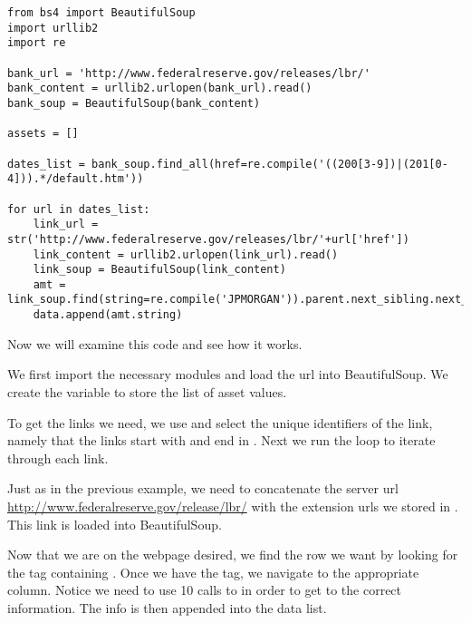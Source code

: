\begin{lstlisting}
from bs4 import BeautifulSoup
import urllib2
import re

bank_url = 'http://www.federalreserve.gov/releases/lbr/'
bank_content = urllib2.urlopen(bank_url).read()
bank_soup = BeautifulSoup(bank_content)

assets = []

dates_list = bank_soup.find_all(href=re.compile('((200[3-9])|(201[0-4])).*/default.htm'))

for url in dates_list:
    link_url = str('http://www.federalreserve.gov/releases/lbr/'+url['href'])
    link_content = urllib2.urlopen(link_url).read()
    link_soup = BeautifulSoup(link_content)
    amt = link_soup.find(string=re.compile('JPMORGAN')).parent.next_sibling.next_sibling.next_sibling.next_sibling.next_sibling.next_sibling.next_sibling.next_sibling.next_sibling.next_sibling
    data.append(amt.string)
\end{lstlisting}
Now we will examine this code and see how it works.

We first import the necessary modules and load the url into BeautifulSoup.
We create the variable  to store the list of asset values.

To get the links we need, we use  and select the unique identifiers of the link, namely that the links start with  and end in .
Next we run the  loop to iterate through each link.

Just as in the previous example, we need to concatenate the server url \url{http://www.federalreserve.gov/release/lbr/} with the extension urls we stored in .
This link is loaded into BeautifulSoup.

Now that we are on the webpage desired, we find the row we want by looking for the tag containing . Once we have the tag, we navigate to the appropriate column.
Notice we need to use 10 calls to  in order to get to the correct information.
The info is then appended into the data list.

